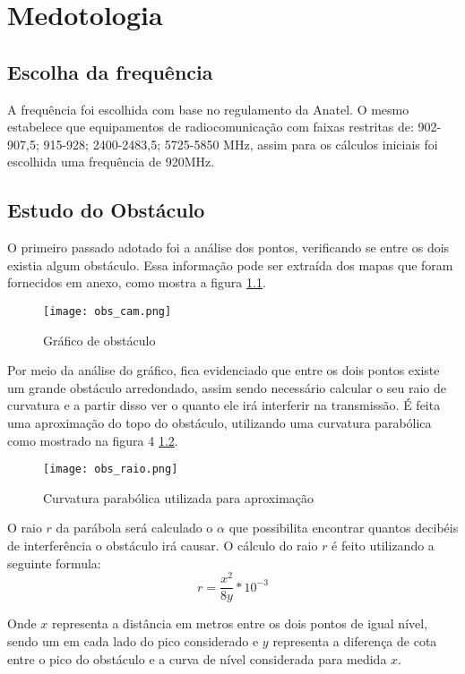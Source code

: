 \chapter{Medotologia}\label{cap:CnptDsng}

\section{Escolha da frequência}\label{sec:esc_freq}
A frequência foi escolhida com base no regulamento da Anatel. O mesmo estabelece que equipamentos de radiocomunicação com faixas restritas de: 902-907,5; 915-928; 2400-2483,5; 5725-5850 MHz, assim para os cálculos iniciais foi escolhida uma frequência de 920MHz.

\section{Estudo do Obstáculo}\label{sec:est_obs}
O primeiro passado adotado foi a análise dos pontos, verificando se entre os dois existia algum obstáculo. Essa informação pode ser extraída dos mapas que foram fornecidos em anexo, como mostra a figura \ref{fig:obs_cam}.
\begin{figure}[h]
	\centering
	\texttt{[image: obs\_cam.png]}
	\caption{Gráfico de obstáculo}
	\label{fig:obs_cam}
\end{figure} 

Por meio da análise do gráfico, fica evidenciado que entre os dois pontos existe um grande obstáculo arredondado, assim sendo necessário calcular o seu raio de curvatura e a partir disso ver o quanto ele irá interferir na transmissão.
É feita uma aproximação do topo do obstáculo, utilizando uma curvatura parabólica como mostrado na figura 4 \ref{fig:obs_raio}.
\begin{figure}[h]
	\centering
	\texttt{[image: obs\_raio.png]}
	\label{fig:obs_raio}
	\caption{Curvatura parabólica utilizada para aproximação}
\end{figure} 

O raio $r$ da parábola será calculado o $\alpha$ que possibilita encontrar quantos decibéis de interferência o obstáculo irá causar. O cálculo do raio $r$ é feito utilizando a seguinte formula:
\begin{equation}
r = \dfrac{x^2}{8y}*10^{-3}
\end{equation}

Onde $x$ representa a distância em metros entre os dois pontos de igual nível, sendo um em cada lado do pico considerado e $y$ representa a diferença de cota entre o pico do obstáculo e a curva de nível considerada para  medida $x$.

